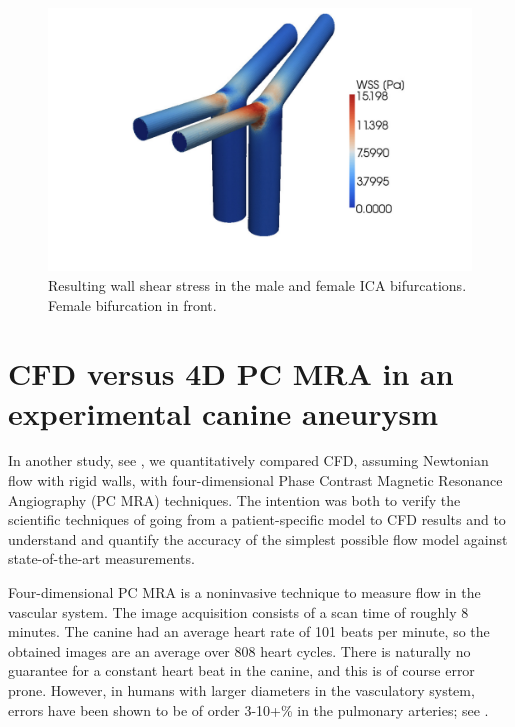 \begin{figure}
  \center\includegraphics[width=\largefig]{chapters/kvs-2/pdf/icas_wss.pdf}
    \caption{Resulting wall shear stress in the male and female ICA
      bifurcations. Female bifurcation in front.}
    \label{fig:kvs-2:ica_wss_res}
\end{figure}

\section{CFD versus 4D PC MRA in an experimental canine aneurysm} \label{dog_study}

In another study, see \citet{JiangJohnsonValen-SendstadEtAl2010}, we
quantitatively compared CFD, assuming Newtonian flow with rigid walls,
with four-dimensional Phase Contrast Magnetic Resonance Angiography
(PC MRA) techniques. The intention was both to verify the scientific
techniques of going from a patient-specific model to CFD results and
to understand and quantify the accuracy of the simplest possible flow
model against state-of-the-art measurements.

Four-dimensional PC MRA is a noninvasive technique to measure flow in
the vascular system. The image acquisition consists of a scan time of
roughly 8 minutes. The canine had  an average heart rate
of 101 beats per minute,
so the obtained images are an average over 808 heart cycles. There is
naturally no guarantee for a constant heart beat in the canine, and
this is of course error prone. However, in humans with larger
diameters in the vasculatory system, errors have been shown to be of
order 3-10+\% in the pulmonary arteries;
see \citet{LotzMeierLeppertEtAl2002,EvansIwaiGristEtAl1993}.


